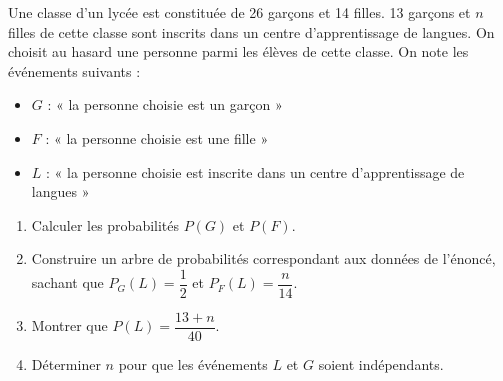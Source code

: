 \documentclass[11pt]{article}
\begin{document}

Une classe d'un lycée est constituée de 26 garçons et 14 filles. 13 garçons et $n$ filles de cette classe sont inscrits dans un centre d'apprentissage de langues. On choisit au hasard une personne parmi les élèves de cette classe. On note les événements suivants :
\begin{itemize}
  \item $G$ : « la personne choisie est un garçon »
  \item $F$ : « la personne choisie est une fille »
  \item $L$ : « la personne choisie est inscrite dans un centre d'apprentissage de langues »
\end{itemize}

\begin{enumerate}
  \item Calculer les probabilités $P(G)$ et $P(F)$.
  \item Construire un arbre de probabilités correspondant aux données de l'énoncé, sachant que $P_G(L) = \dfrac{1}{2}$ et $P_F(L) = \dfrac{n}{14}$.
  \item Montrer que $P(L) = \dfrac{13 + n}{40}$.
  \item Déterminer $n$ pour que les événements $L$ et $G$ soient indépendants.
\end{enumerate}
\end{document}
